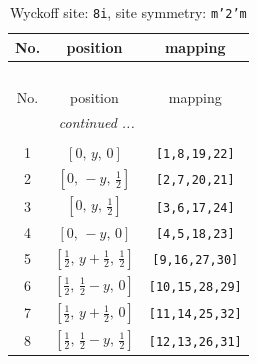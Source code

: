 \documentclass[fleqn,8pt]{jsarticle}
\begin{document}
\begin{longtable}{ccc}
\caption{Wyckoff site: {\tt 8i}, site symmetry: {\tt m'2'm}}
 \\
 \hline \hline
No. & position & mapping \\ \hline \endfirsthead

\multicolumn{2}{l}{\tablename\ \thetable{}} \\
 \hline \hline
No. & position & mapping \\ \hline \endhead

 \hline \hline
\multicolumn{2}{r}{\footnotesize\it continued ...} \\ \endfoot

 \hline \hline
\multicolumn{2}{r}{} \\ \endlastfoot

1 & $\left[ 0,\, y,\, 0 \right]$ & {\tt [1,8,19,22]} \\ \hline
2 & $\left[ 0,\, - y,\, \frac{1}{2} \right]$ & {\tt [2,7,20,21]} \\ \hline
3 & $\left[ 0,\, y,\, \frac{1}{2} \right]$ & {\tt [3,6,17,24]} \\ \hline
4 & $\left[ 0,\, - y,\, 0 \right]$ & {\tt [4,5,18,23]} \\ \hline
5 & $\left[ \frac{1}{2},\, y + \frac{1}{2},\, \frac{1}{2} \right]$ & {\tt [9,16,27,30]} \\ \hline
6 & $\left[ \frac{1}{2},\, \frac{1}{2} - y,\, 0 \right]$ & {\tt [10,15,28,29]} \\ \hline
7 & $\left[ \frac{1}{2},\, y + \frac{1}{2},\, 0 \right]$ & {\tt [11,14,25,32]} \\ \hline
8 & $\left[ \frac{1}{2},\, \frac{1}{2} - y,\, \frac{1}{2} \right]$ & {\tt [12,13,26,31]} \\
\end{longtable}
\renewcommand{\arraystretch}{1.2}
\end{document}
